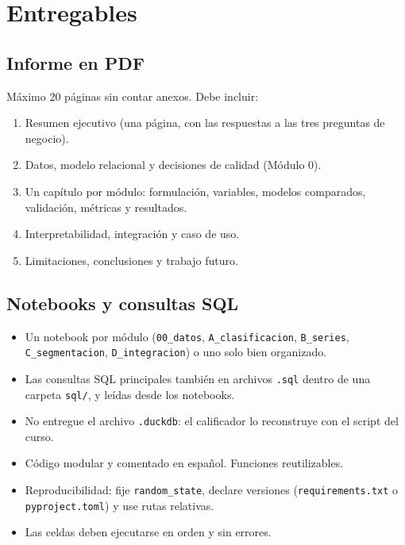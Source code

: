 \documentclass[11pt,letterpaper]{article}
\begin{document}
\section{Entregables}

\subsection{Informe en PDF}
Máximo 20 páginas sin contar anexos. Debe incluir:
\begin{enumerate}
  \item Resumen ejecutivo (una página, con las respuestas a las tres preguntas de negocio).
  \item Datos, modelo relacional y decisiones de calidad (Módulo 0).
  \item Un capítulo por módulo: formulación, variables, modelos comparados, validación, métricas y resultados.
  \item Interpretabilidad, integración y caso de uso.
  \item Limitaciones, conclusiones y trabajo futuro.
\end{enumerate}

\subsection{Notebooks y consultas SQL}
\begin{itemize}
  \item Un notebook por módulo (\texttt{00\_datos}, \texttt{A\_clasificacion}, \texttt{B\_series}, \texttt{C\_segmentacion}, \texttt{D\_integracion}) o uno solo bien organizado.
  \item Las consultas SQL principales también en archivos \texttt{.sql} dentro de una carpeta \texttt{sql/}, y leídas desde los notebooks.
  \item No entregue el archivo \texttt{.duckdb}: el calificador lo reconstruye con el script del curso.
  \item Código modular y comentado en español. Funciones reutilizables.
  \item Reproducibilidad: fije \texttt{random\_state}, declare versiones (\texttt{requirements.txt} o \texttt{pyproject.toml}) y use rutas relativas.
  \item Las celdas deben ejecutarse en orden y sin errores.
\end{itemize}
\end{document}
